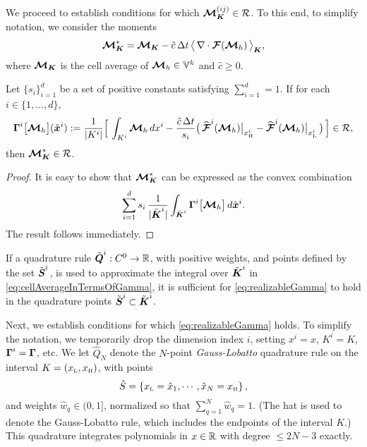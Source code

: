 We proceed to establish conditions for which $\boldsymbol{\mathcal{M}}_{\boldsymbol{K}}^{(ij)}\in\mathcal{R}$.  
To this end, to simplify notation, we consider the moments
\begin{equation}
  \boldsymbol{\mathcal{M}}_{\boldsymbol{K}}^{*}
  =\boldsymbol{\mathcal{M}}_{\boldsymbol{K}}-\hat{c}\,\Delta t\,\big\langle\,\nabla\cdot\boldsymbol{\mathcal{F}}(\boldsymbol{\mathcal{M}}_{h})\,\big\rangle_{\boldsymbol{K}},
\end{equation}
where $\boldsymbol{\mathcal{M}}_{\boldsymbol{K}}$ is the cell average of $\boldsymbol{\mathcal{M}}_{h}\in\mathbb{V}^{k}$ and $\hat{c}\ge0$.  
\begin{lemma}
  Let $\{s_{i}\}_{i=1}^{d}$ be a set of positive constants satisfying $\sum_{i=1}^{d}=1$.  
  If for each $i\in\{1,\ldots,d\}$, 
  \begin{equation}
    \boldsymbol{\Gamma}^{i}\big[\boldsymbol{\mathcal{M}}_{h}\big](\tilde{\boldsymbol{x}}^{i})
    :=\frac{1}{|K^{i}|}
    \Big[\,\int_{K^{i}}\boldsymbol{\mathcal{M}}_{h}\,dx^{i}-\frac{\hat{c}\,\Delta t}{s_{i}}\big(\,\widehat{\boldsymbol{\mathcal{F}}}^{i}(\boldsymbol{\mathcal{M}}_{h})\big|_{x_{\mbox{\tiny H}}^{i}}-\widehat{\boldsymbol{\mathcal{F}}}^{i}(\boldsymbol{\mathcal{M}}_{h})\big|_{x_{\mbox{\tiny L}}^{i}}\,\big)\,\Big]\in\mathcal{R},
    \label{eq:realizableGamma}
  \end{equation}
  then $\boldsymbol{\mathcal{M}}_{\boldsymbol{K}}^{*}\in\mathcal{R}$.  
\end{lemma}
\begin{proof}
  It is easy to show that $\boldsymbol{\mathcal{M}}_{\boldsymbol{K}}^{*}$ can be expressed as the convex combination
  \begin{equation}
    \sum_{i=1}^{d}s_{i}\,\frac{1}{|\tilde{\boldsymbol{\boldsymbol{K}}}^{i}|}\int_{\tilde{\boldsymbol{K}}^{i}}\boldsymbol{\Gamma}^{i}\big[\boldsymbol{\mathcal{M}}_{h}\big]\,d\tilde{\boldsymbol{x}}^{i}.  
    \label{eq:cellAverageInTermsOfGamma}
  \end{equation}
  The result follows immediately.  
\end{proof}
\begin{rem}
  If a quadrature rule $\tilde{\boldsymbol{Q}}^{i}:C^{0}\to\mathbb{R}$, with positive weights, and points defined by the set $\tilde{\boldsymbol{S}}^{i}$, is used to approximate the integral over $\tilde{\boldsymbol{K}}^{i}$ in \eqref{eq:cellAverageInTermsOfGamma}, it is sufficient for \eqref{eq:realizableGamma} to hold in the quadrature points $\tilde{\boldsymbol{S}}^{i}\subset\tilde{\boldsymbol{K}}^{i}$.  
\end{rem}

Next, we establish conditions for which \eqref{eq:realizableGamma} holds.  
To simplify the notation, we temporarily drop the dimension index $i$, setting $x^{i}=x$, $K^{i}=K$, $\boldsymbol{\Gamma}^{i}=\boldsymbol{\Gamma}$, etc.  
We let $\hat{Q}_{N}$ denote the $N$-point \emph{Gauss-Lobatto} quadrature rule on the interval $K=(x_{\mbox{\tiny L}},x_{\mbox{\tiny H}})$, with points
\begin{equation}
  \hat{S}=\left\{x_{\mbox{\tiny L}}=\hat{x}_{1},\cdots,\hat{x}_{N}=x_{\mbox{\tiny H}}\right\}, 
  \label{eq:quadraturePointsGL}
\end{equation}
and weights $\hat{w}_{q} \in (0,1]$, normalized so that $\sum_{q=1}^{N} \hat{w}_{q} = 1$.  
(The hat is used to denote the Gauss-Lobatto rule, which includes the endpoints of the interval $K$.)
This quadrature integrates polynomials in $x \in \mathbb{R}$ with degree $\le2N-3$ exactly.  